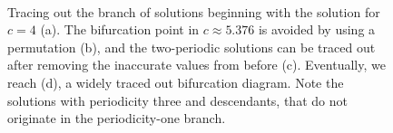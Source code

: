\begin{figure}[!ht]
	\centering
	\quad
	\\
	\quad
	\caption{Tracing out the branch of solutions beginning with the solution for
	$c=4$ (a). The bifurcation point in $c \approx 5.376$ is avoided by using a permutation (b),
	and the two-periodic solutions can be traced out after removing the inaccurate values
	from before (c). Eventually, we reach (d), a widely traced out bifurcation diagram.
	Note the solutions with periodicity three and descendants, that do not originate in
	the periodicity-one branch.}
	\label{fig:reosslerseq}
\end{figure}

